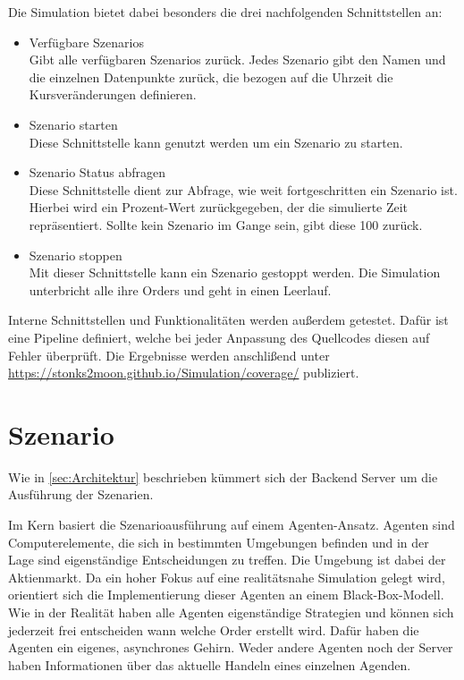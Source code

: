 Die Simulation bietet dabei besonders die drei nachfolgenden Schnittstellen an:
\begin{itemize}
    \item Verfügbare Szenarios\\
        Gibt alle verfügbaren Szenarios zurück. Jedes Szenario gibt den Namen und die einzelnen Datenpunkte zurück, die bezogen auf die Uhrzeit die Kursveränderungen definieren.
    \item Szenario starten\\
        Diese Schnittstelle kann genutzt werden um ein Szenario zu starten.
    \item Szenario Status abfragen\\
        Diese Schnittstelle dient zur Abfrage, wie weit fortgeschritten ein Szenario ist. Hierbei wird ein Prozent-Wert zurückgegeben, der die simulierte Zeit repräsentiert. Sollte kein Szenario im Gange sein, gibt diese 100 zurück.
    \item Szenario stoppen\\
        Mit dieser Schnittstelle kann ein Szenario gestoppt werden. Die Simulation unterbricht alle ihre Orders und geht in einen Leerlauf.
\end{itemize}

Interne Schnittstellen und Funktionalitäten werden außerdem getestet.
Dafür ist eine Pipeline definiert, welche bei jeder Anpassung des Quellcodes diesen auf Fehler überprüft.
Die Ergebnisse werden anschlißend unter \href{https://stonks2moon.github.io/Simulation/coverage/}{https://stonks2moon.github.io/Simulation/coverage/} publiziert.

\section{Szenario}
Wie in \autoref{sec:Architektur} beschrieben kümmert sich der Backend Server um die Ausführung der Szenarien.

Im Kern basiert die Szenarioausführung auf einem Agenten-Ansatz. Agenten sind Computerelemente, die sich in bestimmten Umgebungen befinden und in der Lage sind eigenständige Entscheidungen zu treffen. Die Umgebung ist dabei der Aktienmarkt.
Da ein hoher Fokus auf eine realitätsnahe Simulation gelegt wird, orientiert sich die Implementierung dieser Agenten an einem Black-Box-Modell.
Wie in der Realität haben alle Agenten eigenständige Strategien und können sich jederzeit frei entscheiden wann welche Order erstellt wird. Dafür haben die Agenten ein eigenes, asynchrones Gehirn.
Weder andere Agenten noch der Server haben Informationen über das aktuelle Handeln eines einzelnen Agenden.

